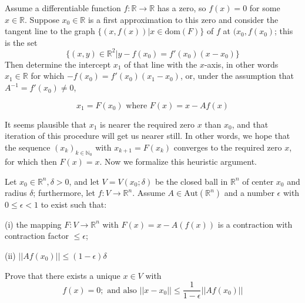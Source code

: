 \begin{exercise}{6}
    Assume a differentiable function $f: \mathbb{R} \rightarrow \mathbb{R}$ has a zero, so $f(x) = 0$ for some $x \in \mathbb{R}$.
    Suppose $x_0 \in \mathbb{R}$ is a first approximation to this zero and consider the tangent line to the graph $\{(x, f(x)) \lvert x \in \text{dom}(F)\}$ of $f$ at $(x_0, f(x_0)$; this is the set
    $$\{(x, y) \in \mathbb{R}^2 \lvert y -f(x_0) = f'(x_0)(x - x_0)\}$$
    Then determine the intercept $x_1$ of that line with the $x$-axis, in other words $x_1 \in \mathbb{R}$ for which $-f(x_0) = f'(x_0)(x_1 - x_0)$, or, under the assumption that $A^{-1} = f'(x_0) \neq 0$,
    
    $$x_1 = F(x_0) \text{ where } F(x) = x - Af(x)$$
    
    It seems plausible that $x_1$ is nearer the required zero $x$ than $x_0$, and that iteration of this procedure will get us nearer still.
    In other words, we hope that the sequence $(x_k)_{k \in \mathbb{N}_0}$ with $x_{k+1} = F(x_k)$ converges to the required zero $x$, for which then $F(x) = x$.
    Now we formalize this heuristic argument.

    Let $x_0 \in \mathbb{R}^n, \delta > 0$, and let $V = V(x_0; \delta)$ be the closed ball in $\mathbb{R}^n$ of center $x_0$ and radius $\delta$; furthermore, let $f: V \rightarrow \mathbb{R}^n$.
    Assume $A \in \text{Aut}(\mathbb{R}^n)$ and a number $\epsilon$ with $0 \leq \epsilon < 1$ to exist such that:

    (i) the mapping $F: V \rightarrow \mathbb{R}^n$ with $F(x) = x - A(f(x))$ is a contraction with contraction factor $\leq \epsilon$;

    (ii) $\lvert \lvert A f(x_0) \rvert \rvert \leq (1 - \epsilon) \delta$

    Prove that there exists a unique $x \in V$ with
    $$f(x) = 0; \text{ and also } \lvert \lvert x - x_0 \rvert \rvert \leq 
    \frac{1}{1 - \epsilon}\lvert \lvert A f(x_0) \rvert \rvert$$
\end{exercise}

